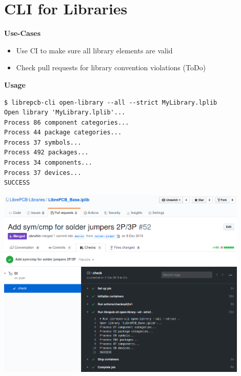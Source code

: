 \section{CLI for Libraries}

\begin{frame}[fragile]{\secname}
  \textbf{Use-Cases}
  \begin{itemize}
    \item Use CI to make sure all library elements are valid
    \item Check pull requests for library convention violations (ToDo)
  \end{itemize}

  \bigskip

  \textbf{Usage}
  \small
  \begin{verbatim}
$ librepcb-cli open-library --all --strict MyLibrary.lplib
Open library 'MyLibrary.lplib'...
Process 86 component categories...
Process 44 package categories...
Process 37 symbols...
Process 492 packages...
Process 34 components...
Process 37 devices...
SUCCESS
  \end{verbatim}
\end{frame}


\begin{frame}{\secname}
  \begin{center}
    \includegraphics[width=0.9\textwidth]{images/cli_libraries_github.png}
  \end{center}
\end{frame}
